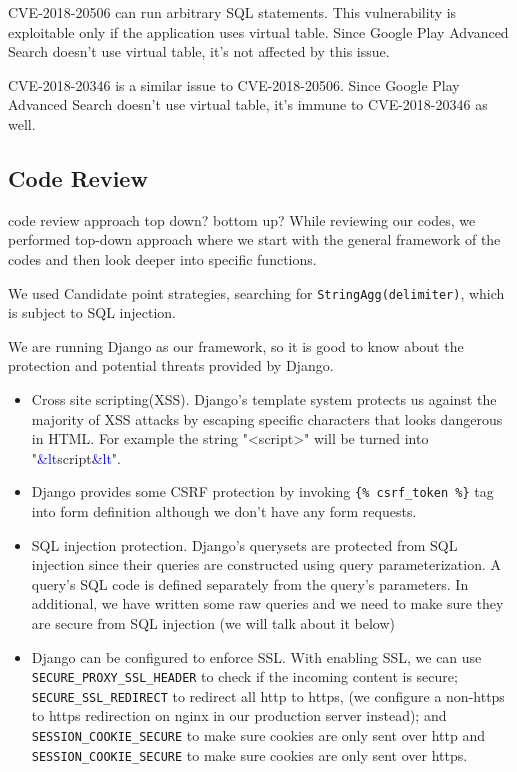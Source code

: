 \documentclass[12pt, a4paper]{article}
\newcommand{\code}[1]{\texttt{#1}}
\begin{document}
CVE-2018-20506 can run arbitrary SQL statements. This vulnerability is exploitable only if the application uses virtual table. Since Google Play Advanced Search doesn't use virtual table, it's not affected by this issue.

CVE-2018-20346 is a similar issue to CVE-2018-20506. Since Google Play Advanced Search doesn't use virtual table, it's immune to CVE-2018-20346 as well.




\subsection{Code Review}
code review approach
top down? bottom up?
While reviewing our codes, we performed top-down approach where we start with the general framework of the codes and then look deeper into specific functions.

We used Candidate point strategies, searching for \code{StringAgg(delimiter)}, which is subject to SQL injection.




We are running Django as our framework, so it is good to know about the protection and potential threats provided by Django.
\begin{itemize}
    \item Cross site scripting(XSS). Django's template system protects us against the majority of XSS attacks by escaping specific characters that looks dangerous in HTML. For example the string "<script>" will be turned into "\textcolor{blue}{\&lt}script\textcolor{blue}{\&lt}".
    \item Django provides some CSRF protection by invoking \code{\{\% csrf\_token \%\}} tag into form definition although we don't have any form requests.
    \item SQL injection protection. Django’s querysets are protected from SQL injection since their queries are constructed using query parameterization. A query’s SQL code is defined separately from the query’s parameters. In additional, we have written some raw queries and we need to make sure they are secure from SQL injection (we will talk about it below)
    \item Django can be configured to enforce SSL. With enabling SSL, we can use \code{SECURE\_PROXY\_SSL\_HEADER} to check if the incoming content is secure; \code{SECURE\_SSL\_REDIRECT} to redirect all http to https, (we configure a non-https to https redirection on nginx in our production server instead); and \code{SESSION\_COOKIE\_SECURE} to make sure cookies are only sent over http and \code{SESSION\_COOKIE\_SECURE} to make sure cookies are only sent over https.
\end{itemize}
\end{document}
